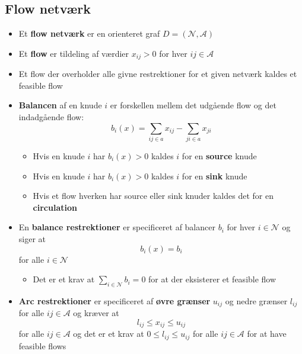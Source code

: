 \subsection{Flow netværk}
\begin{itemize}
	\item Et \textbf{flow netværk} er en orienteret graf $D=(\mathcal N, \mathcal A)$
  \item Et \textbf{flow} er tildeling af værdier $x_{ij}>0$ for hver $ij \in \mathcal A$ 
  \item Et flow der overholder alle givne restrektioner for et given netværk kaldes et feasible flow
    \item \textbf{Balancen} af en knude $i$ er forskellen mellem det udgående flow og det indadgående flow:
    \begin{equation*}
      b_i(x) = \sum_{ij \in a} x_{ij} - \sum_{ji \in a} x_{ji}
    \end{equation*}
    \begin{itemize}
      \item Hvis en knude $i$ har $b_i(x) > 0$ kaldes $i$ for en \textbf{source} knude
      \item Hvis en knude $i$ har $b_i(x) > 0$ kaldes $i$ for en \textbf{sink} knude
      \item Hvis et flow hverken har source eller sink knuder kaldes det for en \textbf{circulation}
  \end{itemize}
  \item En \textbf{balance restrektioner} er specificeret af balancer $b_i$ for hver $i \in \mathcal N$ og siger at
  \begin{equation*}
 	  b_i(x) = b_i 
  \end{equation*}
  for alle $i \in \mathcal N$
  \begin{itemize}
  	\item Det er et krav at $\sum_{i \in \mathcal N} b_i = 0$ for at der eksisterer et feasible flow
  \end{itemize}
  \item \textbf{Arc restrektioner} er specificeret af \textbf{øvre grænser} $u_{ij}$ og nedre grænser $l_{ij}$ for alle $ij \in \mathcal A$ og kræver at
  \begin{equation*}
    l_{ij} \leq x_{ij} \leq u_{ij}
  \end{equation*}
  for alle $ij \in \mathcal A$ og det er et krav at $0 \leq l_{ij} \leq u_{ij}$ for alle $ij \in \mathcal A$ for at have feasible flows
\end{itemize}

